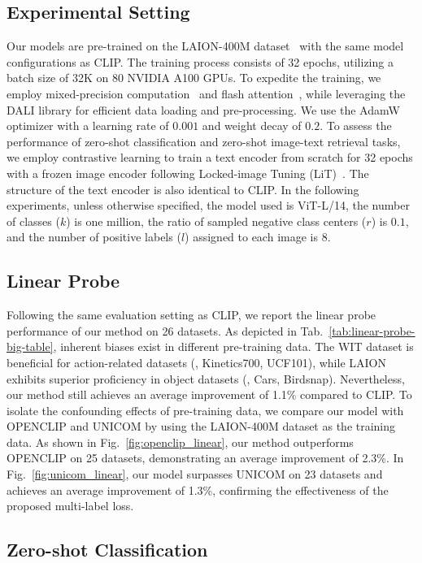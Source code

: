 \subsection{Experimental Setting}
Our models are pre-trained on the LAION-400M dataset~\cite{schuhmann2021laion} with the same model configurations as CLIP. The training process consists of 32 epochs, utilizing a batch size of 32K on 80 NVIDIA A100 GPUs. To expedite the training, we employ mixed-precision computation~\cite{micikevicius2017mixed} and flash attention~\cite{dao2023flashattention2}, while leveraging the DALI library for efficient data loading and pre-processing. We use the AdamW optimizer with a learning rate of $0.001$ and weight decay of $0.2$. To assess the performance of zero-shot classification and zero-shot image-text retrieval tasks, we employ contrastive learning to train a text encoder from scratch for 32 epochs with a frozen image encoder following Locked-image Tuning (LiT)~\cite{zhai2022lit}. The structure of the text encoder is also identical to CLIP. In the following experiments, unless otherwise specified, the model used is ViT-L/14, the number of classes ($k$) is one million, the ratio of sampled negative class centers ($r$) is $0.1$, and the number of positive labels ($l$) assigned to each image is $8$.

\subsection{Linear Probe}

Following the same evaluation setting as CLIP, we report the linear probe performance of our method on 26 datasets. As depicted in Tab.~\ref{tab:linear-probe-big-table}, inherent biases exist in different pre-training data. The WIT dataset is beneficial for action-related datasets (\eg, Kinetics700, UCF101), while LAION exhibits superior proficiency in object datasets (\eg, Cars, Birdsnap). Nevertheless, our method still achieves an average improvement of 1.1\% compared to CLIP. 
To isolate the confounding effects of pre-training data, we compare our model with OPENCLIP and UNICOM by using the LAION-400M dataset as the training data.
As shown in Fig.~\ref{fig:openclip_linear}, our method outperforms OPENCLIP on 25 datasets, demonstrating an average improvement of 2.3\%. 
In Fig.~\ref{fig:unicom_linear},
our model surpasses UNICOM on 23 datasets and achieves an average improvement of 1.3\%, confirming the effectiveness of the proposed multi-label loss.

\subsection{Zero-shot Classification}

